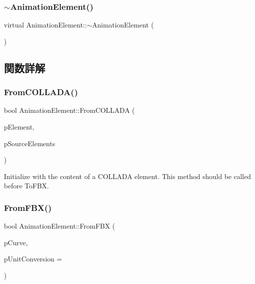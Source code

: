 \subsubsection{\texorpdfstring{$\sim$\+Animation\+Element()}{~AnimationElement()}}
{\footnotesize\ttfamily virtual Animation\+Element\+::$\sim$\+Animation\+Element (\begin{DoxyParamCaption}{ }\end{DoxyParamCaption})\hspace{0.3cm}{\ttfamily [virtual]}}



\subsection{関数詳解}
\mbox{\label{class_animation_element_ad0a36ae16945ef4a3027bb8f57452c45}} 
\subsubsection{\texorpdfstring{From\+C\+O\+L\+L\+A\+D\+A()}{FromCOLLADA()}}
{\footnotesize\ttfamily bool Animation\+Element\+::\+From\+C\+O\+L\+L\+A\+DA (\begin{DoxyParamCaption}\item[{xml\+Node $\ast$}]{p\+Element,  }\item[{const \hyperlink{fbxcolladautils_8h_a43e0f8079e4c5df7b8b0496de1f120c3}{Source\+Element\+Map\+Type} \&}]{p\+Source\+Elements }\end{DoxyParamCaption})}

Initialize with the content of a C\+O\+L\+L\+A\+DA element. This method should be called before To\+F\+BX. \mbox{\label{class_animation_element_a44a774ba612fb2707dee931048231686}} 
\subsubsection{\texorpdfstring{From\+F\+B\+X()}{FromFBX()}}
{\footnotesize\ttfamily bool Animation\+Element\+::\+From\+F\+BX (\begin{DoxyParamCaption}\item[{const \hyperlink{class_fbx_anim_curve}{Fbx\+Anim\+Curve} $\ast$}]{p\+Curve,  }\item[{double}]{p\+Unit\+Conversion = {} }\end{DoxyParamCaption})}

